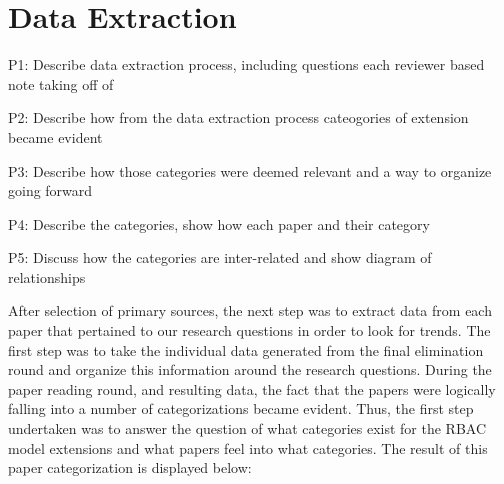 \section{Data Extraction} \label{sec:extraction}

P1: Describe data extraction process, including questions each reviewer based note taking off of

P2: Describe how from the data extraction process cateogories of extension became evident

P3: Describe how those categories were deemed relevant and a way to organize going forward

P4: Describe the categories, show how each paper and their category

P5: Discuss how the categories are inter-related and show diagram of relationships

After selection of primary sources, the next step was to extract data from each paper that pertained to our research questions in order to look for trends.  The first step was to take the individual data generated from the final elimination round and organize this information around the research questions.  During the paper reading round, and resulting data, the fact that the papers were logically falling into a number of categorizations became evident.  Thus, the first step undertaken was to answer the question of what categories exist for the RBAC model extensions and what papers feel into what categories.  The result of this paper categorization is displayed below:

